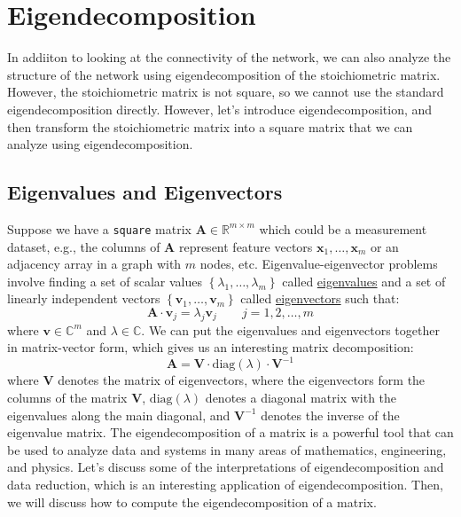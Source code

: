 \documentclass{article}[11pt]
\begin{document}
\section{Eigendecomposition}
In addiiton to looking at the connectivity of the network, we can also analyze the structure of the network using eigendecomposition of the stoichiometric matrix.
However, the stoichiometric matrix is not square, so we cannot use the standard eigendecomposition directly. 
However, let's introduce eigendecomposition, and then transform the stoichiometric matrix into a square matrix that we can analyze using eigendecomposition.

\subsection{Eigenvalues and Eigenvectors}
Suppose we have a \texttt{square} matrix $\mathbf{A}\in\mathbb{R}^{m\times{m}}$ which could be a measurement dataset, e.g., the columns of $\mathbf{A}$ represent feature 
vectors $\mathbf{x}_{1},\dots,\mathbf{x}_{m}$ or an adjacency array in a graph with $m$ nodes, etc. Eigenvalue-eigenvector problems involve finding a set of scalar values $\left\{\lambda_{1},\dots,\lambda_{m}\right\}$ called 
\href{https://mathworld.wolfram.com/Eigenvalue.html}{eigenvalues} and a set of linearly independent vectors 
$\left\{\mathbf{v}_{1},\dots,\mathbf{v}_{m}\right\}$ called \href{https://mathworld.wolfram.com/Eigenvector.html}{eigenvectors} such that:
\begin{equation}
\mathbf{A}\cdot\mathbf{v}_{j} = \lambda_{j}\mathbf{v}_{j}\qquad{j=1,2,\dots,m}
\end{equation}
where $\mathbf{v}\in\mathbb{C}^{m}$ and $\lambda\in\mathbb{C}$. We can put the eigenvalues and eigenvectors together in matrix-vector form, which gives us an interesting matrix decomposition:
\begin{equation}
\mathbf{A} = \mathbf{V}\cdot\text{diag}(\lambda)\cdot\mathbf{V}^{-1}
\end{equation}
where $\mathbf{V}$ denotes the matrix of eigenvectors, where the eigenvectors form the columns of the matrix $\mathbf{V}$, $\text{diag}(\lambda)$ denotes a diagonal matrix with the eigenvalues along the main diagonal, 
and $\mathbf{V}^{-1}$ denotes the inverse of the eigenvalue matrix.
The eigendecomposition of a matrix is a powerful tool that can be used to analyze data and systems in many areas of mathematics, engineering, and physics.
Let's discuss some of the interpretations of eigendecomposition and data reduction, which is an interesting application of eigendecomposition. Then, we will discuss how to compute the eigendecomposition of a matrix.
\end{document}
